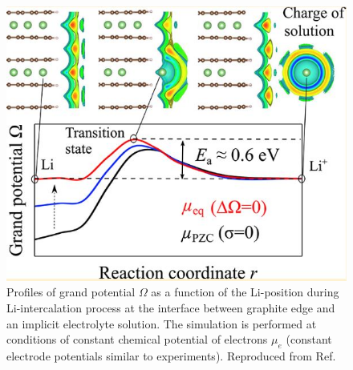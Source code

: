 \documentclass[../main.tex]{subfiles}
\begin{document}
\begin{figure}
    \centering
    \includegraphics[scale=0.6]{figures/graphite-interface.JPG}
    \caption{Profiles of grand potential $\Omega$ as a function of the Li-position during Li-intercalation process at the interface between graphite edge and an implicit electrolyte solution. The simulation is performed at conditions of constant chemical potential of electrons $\mu_e$ (constant electrode potentials similar to experiments). Reproduced from Ref. }
    \label{fig:gel}
\end{figure}
\end{document}
